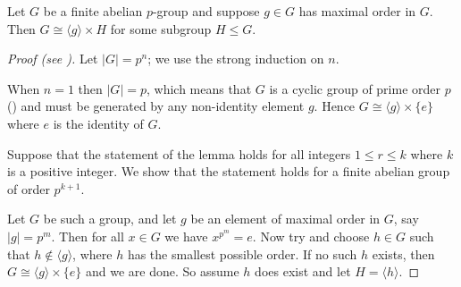 \begin{lemma}\label{lemma-fundamental-theorem-of-finite-abelian-groups-2}
    Let $G$ be a finite abelian $p$-group and suppose $g \in G$ has maximal order in $G$. Then $G \cong \langle g \rangle \times H$ for some subgroup $H \leq G$.
\end{lemma}
\begin{proof}[Proof (see {\cite[Lemma 13.9]{judson_beezer_2022}})]
    Let $|G| = p^n$; we use the strong induction on $n$.

    When $n = 1$ then $|G| = p$, which means that $G$ is a cyclic group of prime order $p$ () and must be generated by any non-identity element $g$. Hence $G \cong \langle g \rangle \times \{e\}$ where $e$ is the identity of $G$.

    Suppose that the statement of the lemma holds for all integers $1 \leq r \leq k$ where $k$ is a positive integer. We show that the statement holds for a finite abelian group of order $p^{k+1}$.

    Let $G$ be such a group, and let $g$ be an element of maximal order in $G$, say $|g| = p^m$. Then for all $x \in G$ we have $x^{p^m} = e$. Now try and choose $h \in G$ such that $h \notin \langle g \rangle$, where $h$ has the smallest possible order. If no such $h$ exists, then $G \cong \langle g \rangle \times \{e\}$ and we are done. So assume $h$ does exist and let $H = \langle h \rangle$.


\end{proof}
